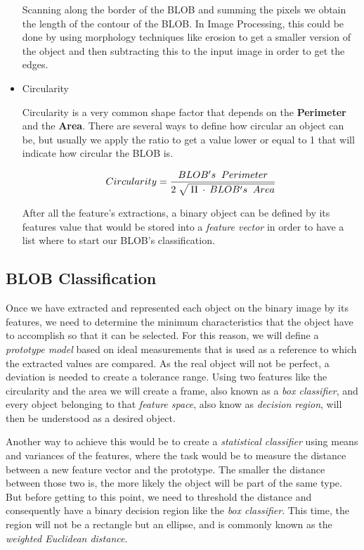 \begin{itemize}
Scanning along the border of the BLOB and summing the pixels we obtain the length of the contour of the BLOB. In Image Processing, this could be done by using morphology techniques like erosion to get a smaller version of the object and then subtracting this to the input image in order to get the edges.

\item Circularity

Circularity is a very common shape factor that depends on the \textbf{Perimeter} and the \textbf{Area}. There are several ways to define how circular an object can be, but usually we apply the ratio to get a value lower or equal to 1 that will indicate how circular the BLOB is.

\begin{equation}	
	\begin{aligned}
	{Circularity}=\displaystyle\frac{BLOB's \;\; Perimeter}{2 \; \sqrt{\mathstrut \: \Pi \: \cdot \: {BLOB's \;\; Area}}}
	\label{Circularity}
	\end{aligned}
\end{equation}

After all the feature's extractions, a binary object can be defined by its features value that would be stored into a \textit{feature vector} in order to have a list where to start our BLOB's classification.

\end{itemize}



\subsection{BLOB Classification}

Once we have extracted and represented each object on the binary image by its features, we need to determine the minimum characteristics that the object have to accomplish so that it can be selected.
For this reason, we will define a \textit{prototype model} based on ideal measurements that is used as a reference to which the extracted values are compared. As the real object will not be perfect, a deviation is needed to create a tolerance range.
Using two features like the circularity and the area we will create a frame, also known as a \textit{box classifier}, and every object belonging to that \textit{feature space}, also know as \textit{decision region}, will then be understood as a desired object.

Another way to achieve this would be to create a \textit{statistical classifier} using means and variances of the features, where the task would be to measure the distance between a new feature vector and the prototype. The smaller the distance between those two is, the more likely the object will be part of the same type. But before getting to this point, we need to threshold the distance and consequently have a binary decision region like the \textit{box classifier}.
This time, the region will not be a rectangle but an ellipse, and is commonly known as the \textit{weighted Euclidean distance}.

